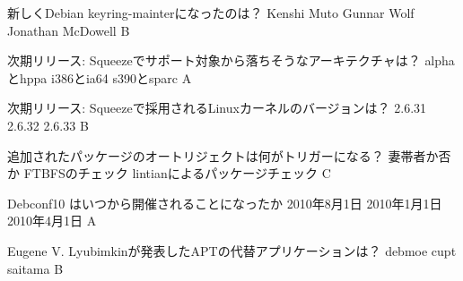 %

\santaku
{新しくDebian keyring-mainterになったのは？}
{Kenshi Muto}
{Gunnar Wolf}
{Jonathan McDowell}
{B}
{}

\santaku
{次期リリース: Squeezeでサポート対象から落ちそうなアーキテクチャは？}
{alphaとhppa}
{i386とia64}
{s390とsparc}
{A}
{}

\santaku
{次期リリース: Squeezeで採用されるLinuxカーネルのバージョンは？}
{2.6.31}
{2.6.32}
{2.6.33}
{B}
{}

\santaku
{追加されたパッケージのオートリジェクトは何がトリガーになる？}
{妻帯者か否か}
{FTBFSのチェック}
{lintianによるパッケージチェック}
{C}
{}

\santaku
{Debconf10 はいつから開催されることになったか}
{2010年8月1日}
{2010年1月1日}
{2010年4月1日}
{A}
{}

\santaku
{Eugene V. Lyubimkinが発表したAPTの代替アプリケーションは？}
{debmoe}
{cupt}
{saitama}
{B}
{}
